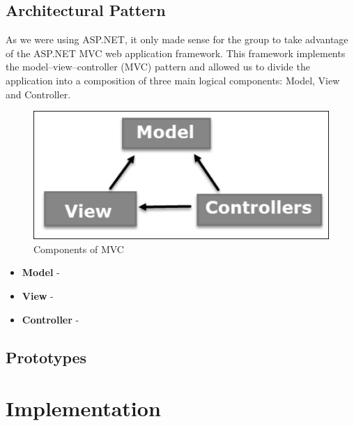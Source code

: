 \documentclass[a4paper]{article}
\begin{document}
	\subsection{Architectural Pattern}
	
	As we were using ASP.NET, it only made sense for the group to take advantage of the ASP.NET MVC web application framework. This framework implements the model–view–controller (MVC) pattern and allowed us to divide the application into a composition of three main logical components: Model, View and Controller. 
	
	\begin{figure}[ht!]
		\centering
		\includegraphics[scale=0.70]{./model_view_controller.jpg}
		\caption{Components of MVC}
		\label{fig:mvc}
	\end{figure}
	
	\begin{itemize}
		\item \textbf{Model} - 
		\item \textbf{View} - 
		\item \textbf{Controller} - 
	\end{itemize}
	
	
	\subsection{Prototypes}
	
	\section{Implementation}
	
	
\end{document}
